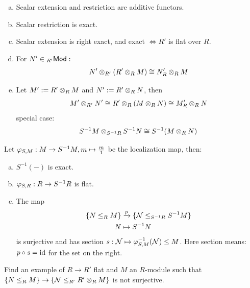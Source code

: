 \documentclass[a4paper]{report}
\begin{document}
\begin{prop}
\begin{enumerate}[(a)]
  \item Scalar extension and restriction are additive functors.
  \item Scalar restriction is exact.
  \item Scalar extension is right exact, and exact $\iff R'$ is flat over $R$.
  \item For $N' \in {}_{R'}\mathsf{Mod}:$ \[N' \otimes_{R'}(R' \otimes_{R} M) \cong N'_{R} \otimes_{R} M\]
  \item Let $M':= R' \otimes_{R} M$ and $N':= R' \otimes_{R} N$, then
        \[M' \otimes_{R'} N' \cong R' \otimes_{R} (M \otimes_{R} N) \cong M'_{R} \otimes_{R} N\]
        special case: \[S^{-1}M \otimes_{S^{-1}R} S^{-1}N \cong S^{-1}(M \otimes_{R} N)\]
\end{enumerate}

\end{prop}

\begin{prop}
  Let $\varphi_{S,M} : M \to S^{-1} M, m \mapsto \frac m1$ be the localization map, then:
  \begin{enumerate}[(a)]
    \item $S^{-1}(-)$ is exact.
    \item $\varphi_{S,R}: R \to S^{-1}R$ is flat.
    \item The map
          \begin{align*}
            \{N \le_{R} M\} &\xrightarrow p \{\mathcal N \le_{S^{-1}R} S^{-1}M\} \\
            N &\mapsto S^{-1}N
          \end{align*}
          is surjective and has section $s: \mathcal N \mapsto \varphi_{S,M}^{-1}(\mathcal N) \le M$. Here section means: $p \circ s = \operatorname{id}$ for the set on the right.
  \end{enumerate}
\end{prop}

\begin{exer*}
Find an example of $R \to R'$ flat and $M$ an $R$-module such that $\{N \le_{R} M\} \to \{\mathcal N \le_{R'} R' \otimes_{R}M\}$ is not surjective.
\end{exer*}
\end{document}
